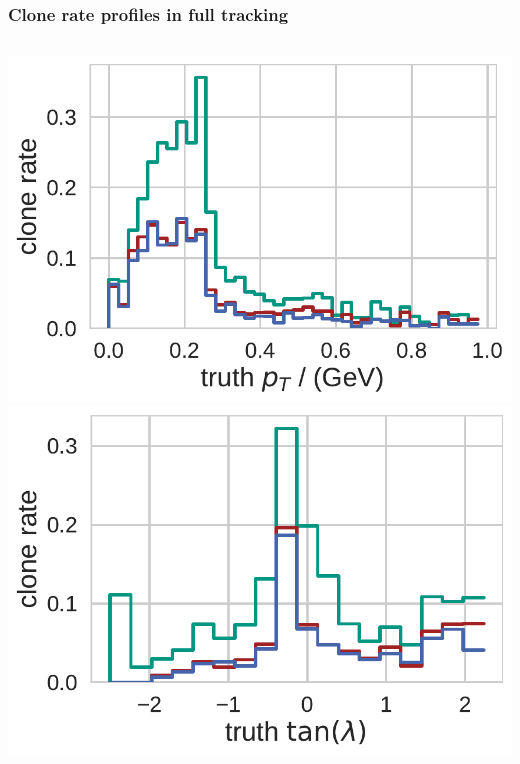 \documentclass[18pt, aspectratio=169]{beamer}
\begin{document}
\begin{frame}
  \frametitle{Clone rate profiles in full tracking}
  \begin{columns}
    \begin{column}{.5\textwidth}
      \centering    
      \includegraphics[width=.55\textwidth]{figures/clone_rate_by_pt_truth_fullreco.pdf}\\
      \includegraphics[width=.55\textwidth]{figures/clone_rate_by_tan_lambda_truth_fullreco.pdf}
    \end{column}


\end{columns}
\end{frame}
\end{document}
